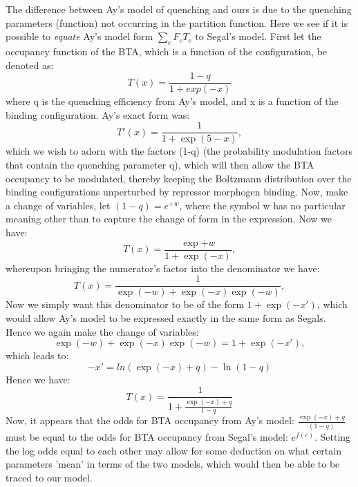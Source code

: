 The difference between Ay's model of quenching and ours is due to the quenching parameters (function) not occurring in the partition function.  Here we see if it is possible to \emph{equate} Ay's model form $\sum_c F_c T_c$ to Segal's model.  First let the occupancy function of the BTA, which is a function of the configuration, be denoted as:
 \begin{equation}
 T(x)=\frac{1-q}{1+exp{(-x)}}
 \end{equation}
 where q is the quenching efficiency from Ay's model, and x is a function of the binding configuration.  Ay's exact form was:
 \begin{equation}
 T'(x)=\frac{1}{1+\exp{(5-x)}},
 \end{equation} 
which we wish to adorn with the factors (1-q) (the probability modulation factors that contain the quenching parameter q), which will then allow the BTA occupancy to be modulated, thereby keeping the Boltzmann distribution over the binding configurations unperturbed by repressor morphogen binding.  Now, make a change of variables, let $(1-q)=e^{+w}$, where the symbol w has no particular meaning other than to capture the change of form in the expression.  Now we have:
\begin{equation}
 T(x)=\frac{\exp{+w}}{1+\exp{(-x)}},
 \end{equation}
 whereupon bringing the numerator's factor into the denominator we have:
 \begin{equation}
 T(x)=\frac{1}{\exp{(-w)}+\exp{(-x)}\exp{(-w)}},
 \end{equation}
Now we simply want this denominator to be of the form $1+\exp{(-x')}$, which would allow Ay's model to be expressed exactly in the same form as Segals.  Hence we again make the change of variables:
\begin{equation}
 \exp{(-w)}+\exp{(-x)}\exp{(-w)}=1+\exp{(-x')},
 \end{equation} 
 which leads to:
 \begin{equation}
 -x' = ln(\exp{(-x)} +q ) - \ln{(1-q)} 
 \end{equation}
 Hence we have:
 \begin{equation}
 T(x) = \frac{1}{1+ \frac{\exp{(-x)}+q}{1-q}}
 \end{equation}
 Now, it appears that the odds for BTA occupancy from Ay's model: $\frac{\exp{(-x)}+q}{(1-q)}$ must be equal to the odds for BTA occupancy from Segal's model: $e^{f(c)}$.  Setting the log odds equal to each other may allow for some deduction on what certain parameters 'mean' in terms of the two models, which would then be able to be traced to our model.
